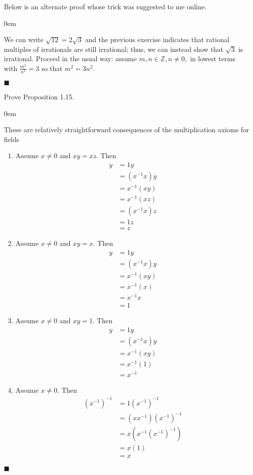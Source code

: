 \documentclass[12pt]{article}
\renewcommand{\qed}{\hfill$\blacksquare$}
\renewenvironment{proof}{\begin{addmargin}[1em]{0em}\begin{newproof}}{\end{newproof}\end{addmargin}\qed}
\newenvironment{problem}[2][Exercise]{\begin{trivlist}
\item[\hskip \labelsep {\bfseries #1}\hskip \labelsep {\bfseries #2.}]}{\end{trivlist}}
\begin{document}
Below is an alternate proof whose trick was suggested to me online.\\

\begin{proof}
We can write $\sqrt{12} = 2\sqrt{3}$ and the previous exercise indicates that rational multiples of irrationals are still irrational; thus, we can instead show that $\sqrt{3}$ is irrational. Proceed in the usual way: assume $m,n\in \mathbb{Z}, n\neq 0,$ in lowest terms with $\frac{m^2}{n^2} = 3$ so that $m^2 = 3 n^2$.
\end{proof}





\begin{problem}{1.3}
Prove Proposition 1.15.
\end{problem}
\begin{proof} 
These are relatively straightforward consequences of the multiplication axioms for fields
\begin{enumerate}[label=(\alph*)]
	\item Assume $x\neq 0$ and $xy=xz$. Then \begin{align*}
	y & = 1 y \\
	& = \left(x^{-1}x\right)y \\
	& = x^{-1}\left(xy\right) \\
	& = x^{-1}\left(xz\right) \\
	& = \left(x^{-1}x\right)z \\
	& = 1 z \\
	& = z
	\end{align*}
	\item Assume $x\neq 0$ and $xy=x$. Then  \begin{align*}
	y & = 1 y \\
	& = \left(x^{-1}x\right)y \\
	& = x^{-1}\left(xy\right) \\
	& = x^{-1}\left(x\right) \\
	& = x^{-1}x \\
	& = 1
	\end{align*}
	\item Assume $x\neq 0 $ and $xy=1$. Then \begin{align*}
	y & = 1 y \\
	& = \left(x^{-1}x\right)y \\
	& = x^{-1}\left(xy\right) \\
	& = x^{-1}\left(1\right) \\
	& = x^{-1} 
	\end{align*}
	\item Assume $x\neq 0$. Then \begin{align*}
	\left(x^{-1}\right)^{-1} & = 1\left(x^{-1}\right)^{-1} \\
	& = \left(x x^{-1}\right)\left(x^{-1}\right)^{-1} \\
	& = x \left(x^{-1} \left(x^{-1}\right)^{-1} \right) \\
	& = x \left(1\right) \\ 
	& = x
	\end{align*}
\end{enumerate}
\end{proof}
\end{document}
